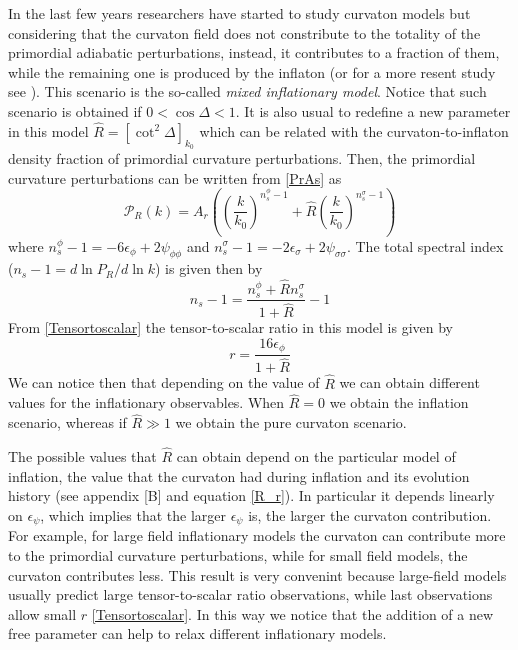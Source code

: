 \documentclass[amssymb,twocolumn,prd,nofootinbib,showpacs]{revtex4-1}
\begin{document}
In the last few years researchers have started to study curvaton models but considering that the curvaton field does not constribute to the totality of the primordial adiabatic perturbations, instead, it contributes to a fraction of them, while the remaining one is produced by the inflaton \cite{curvaton4,curvaton5,curvaton6,curvaton7,curvaton8} (or for a more resent study see \cite{curvaton3}). This scenario is the so-called \textit{mixed inflationary model}. Notice that such scenario is obtained if $0<\cos\Delta <1$. It is also usual to redefine a new parameter in this model $\hat R= [\cot^2\Delta]_{k_0}$ which can be related with the curvaton-to-inflaton density fraction of primordial curvature perturbations. Then, the primordial curvature perturbations can be written from \eqref{PrAs} as
\begin{equation}\label{PCr}
\mathcal{P}_R(k)=A_r\left(\left(\frac{k}{k_{0}}\right)^{n_s^\phi-1}+\hat R\left(\frac{k}{k_{0}}\right)^{n_s^\sigma-1}\right)
\end{equation}
where $n_s^\phi-1 = -6\epsilon_\phi+2\psi_{\phi\phi}$ and $n_s^\sigma-1 = -2\epsilon_\sigma+2\psi_{\sigma\sigma}$.
The total spectral index ($n_s-1=d\ln P_R/d\ln k$) is given then by
\begin{equation}
n_s-1=\frac{n_s^\phi+\hat R n_s^\sigma}{1+\hat R}-1
\end{equation}
From \eqref{Tensortoscalar} the tensor-to-scalar ratio in this model is given by
\begin{equation}\label{tensortoscalar}
r=\frac{16\epsilon_\phi}{1+\hat R}
\end{equation}		
We can notice then that depending on the value of $\hat R$ we can obtain different values for the inflationary observables. When $\hat R=0$ we obtain the inflation scenario, whereas if $\hat R\gg 1$ we obtain the pure curvaton scenario.  

The possible values that $\hat R$ can obtain depend on the particular model of inflation, the value that the curvaton had during inflation and its evolution history (see appendix [B] and equation \eqref{R_r}). In particular it depends linearly on $\epsilon_\psi$, which implies that the larger $\epsilon_\psi$ is, the larger the curvaton contribution. For example, for large field inflationary models the curvaton can contribute more to the primordial curvature perturbations, while for small field models, the curvaton contributes less. This result is very convenint because large-field models usually predict large tensor-to-scalar ratio observations, while last observations allow small $r$ \eqref{Tensortoscalar}. In this way we notice that the addition of a new free parameter can help to relax different inflationary models.  
\end{document}
